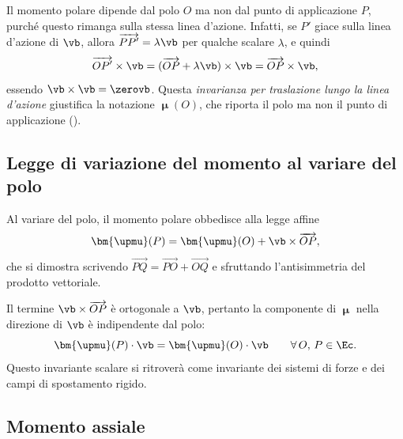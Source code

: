 \begin{oss}
	Il momento polare dipende dal polo $O$ ma non dal punto di
	applicazione $P$, purché questo rimanga sulla stessa linea
	d'azione. Infatti, se $P'$ giace sulla linea d'azione di $\vb$,
	allora $\overrightarrow{PP'} = \lambda\vb$ per qualche scalare
	$\lambda$, e quindi
	\begin{equation}
		\overrightarrow{OP'} \times \vb
		= (\overrightarrow{OP} + \lambda\vb) \times \vb
		= \overrightarrow{OP} \times \vb,
	\end{equation}
	essendo $\vb \times \vb = \zerovb$. Questa \textit{invarianza per
		traslazione lungo la linea d'azione} giustifica la notazione
	$\bm{\upmu}(O)$, che riporta il polo ma non il punto di
	applicazione ().
	



\end{oss}

\subsection{Legge di variazione del momento al variare del polo}

Al variare del polo, il momento polare obbedisce alla legge affine
\begin{equation}\label{eq:trasporto_momento}
	\bm{\upmu}(P) = \bm{\upmu}(O) + \vb \times \overrightarrow{OP},
\end{equation}
che si dimostra scrivendo $\overrightarrow{PQ} =
\overrightarrow{PO} + \overrightarrow{OQ}$ e sfruttando
l'antisimmetria del prodotto vettoriale.

\begin{oss}
	Il termine $\vb \times \overrightarrow{OP}$ è ortogonale a $\vb$,
	pertanto la componente di $\bm{\upmu}$ nella direzione di $\vb$ è
	indipendente dal polo:
	\begin{equation}
		\bm{\upmu}(P) \cdot \vb = \bm{\upmu}(O) \cdot \vb
		\qquad \forall\, O,\, P \in \Ec.
	\end{equation}
	Questo invariante scalare si ritroverà come invariante dei sistemi
	di forze e dei campi di spostamento rigido.
\end{oss}


\subsection{Momento assiale}\label{sec:momento_assiale}

